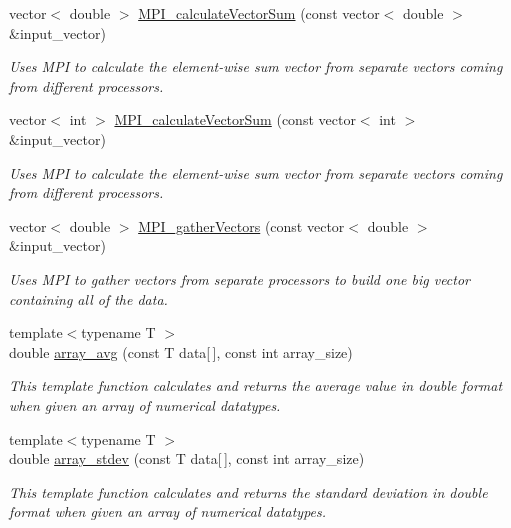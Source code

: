 \begin{DoxyCompactItemize}
vector$<$ double $>$ \hyperlink{namespace_utils_ae42867cb7be2aca3ff23e27a94c4f68b}{M\+P\+I\+\_\+calculate\+Vector\+Sum} (const vector$<$ double $>$ \&input\+\_\+vector)
\begin{DoxyCompactList}\small\item\em Uses M\+PI to calculate the element-\/wise sum vector from separate vectors coming from different processors. \end{DoxyCompactList}\item 
vector$<$ int $>$ \hyperlink{namespace_utils_a07efe2f58beb35b78d295a0b0dc1f660}{M\+P\+I\+\_\+calculate\+Vector\+Sum} (const vector$<$ int $>$ \&input\+\_\+vector)
\begin{DoxyCompactList}\small\item\em Uses M\+PI to calculate the element-\/wise sum vector from separate vectors coming from different processors. \end{DoxyCompactList}\item 
vector$<$ double $>$ \hyperlink{namespace_utils_af9a7e13279f18cd8d36ca98a7943a7e8}{M\+P\+I\+\_\+gather\+Vectors} (const vector$<$ double $>$ \&input\+\_\+vector)
\begin{DoxyCompactList}\small\item\em Uses M\+PI to gather vectors from separate processors to build one big vector containing all of the data. \end{DoxyCompactList}\item 
{\footnotesize template$<$typename T $>$ }\\double \hyperlink{namespace_utils_aa76a204af4dd4c3eb151691825de2eb2}{array\+\_\+avg} (const T data\mbox{[}$\,$\mbox{]}, const int array\+\_\+size)
\begin{DoxyCompactList}\small\item\em This template function calculates and returns the average value in double format when given an array of numerical datatypes. \end{DoxyCompactList}\item 
{\footnotesize template$<$typename T $>$ }\\double \hyperlink{namespace_utils_a25d09c704b5ae03f01cf76b6de10aa19}{array\+\_\+stdev} (const T data\mbox{[}$\,$\mbox{]}, const int array\+\_\+size)
\begin{DoxyCompactList}\small\item\em This template function calculates and returns the standard deviation in double format when given an array of numerical datatypes. \end{DoxyCompactList}\item 

\end{DoxyCompactItemize}
